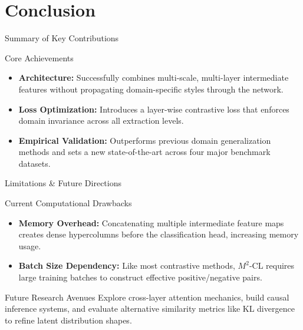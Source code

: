 \documentclass[t, aspectratio=169]{beamer} %
\begin{document}
	\section{Conclusion}

	\begin{frame}{Summary of Key Contributions}
		\begin{block}{Core Achievements}
			\begin{itemize}
				\item \textbf{Architecture:} Successfully combines multi-scale, multi-layer intermediate features without propagating domain-specific styles through the network.
				\item \textbf{Loss Optimization:} Introduces a layer-wise contrastive loss that enforces domain invariance across all extraction levels.
				\item \textbf{Empirical Validation:} Outperforms previous domain generalization methods and sets a new state-of-the-art across four major benchmark datasets.
			\end{itemize}
		\end{block}
	\end{frame}

	\begin{frame}{Limitations \& Future Directions}
		\begin{block}{Current Computational Drawbacks}
			\begin{itemize}
				\item \textbf{Memory Overhead:} Concatenating multiple intermediate feature maps creates dense hypercolumns before the classification head, increasing memory usage.
				\item \textbf{Batch Size Dependency:} Like most contrastive methods, $M^2$-CL requires large training batches to construct effective positive/negative pairs.
			\end{itemize}
		\end{block}
		\begin{alertblock}{Future Research Avenues}
			Explore cross-layer attention mechanics, build causal inference systems, and evaluate alternative similarity metrics like KL divergence to refine latent distribution shapes.
		\end{alertblock}
	\end{frame}

\end{document}
